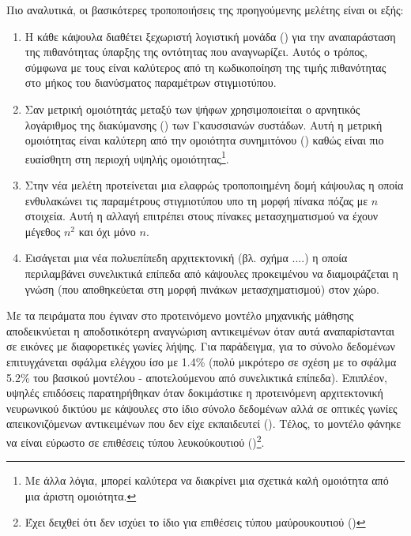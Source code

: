 Πιο αναλυτικά, οι βασικότερες τροποποιήσεις της προηγούμενης μελέτης είναι οι εξής:
\begin{enumerate}
    \item Η κάθε κάψουλα διαθέτει ξεχωριστή λογιστική μονάδα () για την αναπαράσταση της πιθανότητας ύπαρξης της οντότητας που αναγνωρίζει. Αυτός ο τρόπος, σύμφωνα με τους \cite{hinton2018matrix} είναι καλύτερος από τη κωδικοποίηση της τιμής πιθανότητας στο μήκος του διανύσματος παραμέτρων στιγμιοτύπου.
    \item Σαν μετρική ομοιότητάς μεταξύ των ψήφων χρησιμοποιείται ο αρνητικός λογάριθμος της διακύμανσης () των Γκαυσσιανών συστάδων. Αυτή η μετρική ομοιότητας είναι καλύτερη από την ομοιότητα συνημιτόνου () καθώς είναι πιο ευαίσθητη στη περιοχή υψηλής ομοιότητας\footnote{Με άλλα λόγια, μπορεί καλύτερα να διακρίνει μια σχετικά καλή ομοιότητα από μια άριστη ομοιότητα.}.
    \item Στην νέα μελέτη προτείνεται μια ελαφρώς τροποποιημένη δομή κάψουλας η οποία ενθυλακώνει τις παραμέτρους στιγμιοτύπου υπο τη μορφή πίνακα πόζας με $n$ στοιχεία. Αυτή η αλλαγή επιτρέπει στους πίνακες μετασχηματισμού να έχουν μέγεθος $n^2$ και όχι μόνο $n$.
    \item Εισάγεται μια νέα πολυεπίπεδη αρχιτεκτονική (βλ. σχήμα ....) η οποία περιλαμβάνει συνελικτικά επίπεδα από κάψουλες προκειμένου να διαμοιράζεται η γνώση (που αποθηκεύεται στη μορφή πινάκων μετασχηματισμού) στον χώρο.
\end{enumerate}\par

Με τα πειράματα που έγιναν στο προτεινόμενο μοντέλο μηχανικής μάθησης αποδεικνύεται η αποδοτικότερη αναγνώριση αντικειμένων όταν αυτά αναπαρίστανται σε εικόνες με διαφορετικές γωνίες λήψης. Για παράδειγμα, για το σύνολο δεδομένων  επιτυγχάνεται σφάλμα ελέγχου ίσο με 1.4\% (πολύ μικρότερο σε σχέση με το σφάλμα 5.2\% του βασικού μοντέλου - αποτελούμενου από συνελικτικά επίπεδα). Επιπλέον, υψηλές επιδόσεις παρατηρήθηκαν όταν δοκιμάστικε η προτεινόμενη αρχιτεκτονική νευρωνικού δικτύου με κάψουλες στο ίδιο σύνολο δεδομένων αλλά σε οπτικές γωνίες απεικονιζόμενων αντικειμένων που δεν είχε εκπαιδευτεί (). Τέλος, το μοντέλο φάνηκε να είναι εύρωστο σε επιθέσεις τύπου λευκού\textendash κουτιού ()\cite{goodfellow2014explaining}\footnote{Έχει δειχθεί ότι δεν ισχύει το ίδιο για επιθέσεις τύπου μαύρου\textendash κουτιού ()}. 